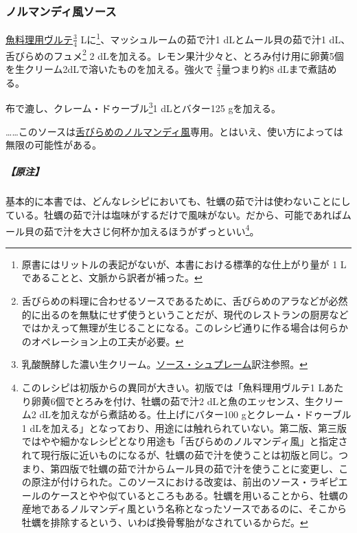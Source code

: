 \begin{recette}
{\subsubsection{ノルマンディ風ソース}\label{sauce-normande}}



\protect\hyperlink{veloute-de-poisson}{魚料理用ヴルテ}\(\frac{3}{4}\)
Lに\footnote{原書にはリットルの表記がないが、本書における標準的な仕上がり量が
  1 Lであることと、文脈から訳者が補った。}、マッシュルームの茹で汁1
dLとムール貝の茹で汁1 dL、舌びらめのフュメ\footnote{舌びらめの料理に合わせるソースであるために、舌びらめのアラなどが必然的に出るのを無駄にせず使うということだが、現代のレストランの厨房などではかえって無理が生じることになる。このレシピ通りに作る場合は何らかのオペレーション上の工夫が必要。}
2
dLを加える。レモン果汁少々と、とろみ付け用に卵黄5個を生クリーム2dLで溶いたものを加える。強火で
\(\frac{2}{3}\)量つまり約8 dLまで煮詰める。

布で漉し、クレーム・ドゥーブル\footnote{乳酸醗酵した濃い生クリーム。\protect\hyperlink{sauce-supreme}{ソース・シュプレーム}訳注参照。}1
dLとバター125 gを加える。

\ldots{}\ldots{}このソースは\protect\hyperlink{sole-normande}{舌びらめのノルマンディ風}専用。とはいえ、使い方によっては無限の可能性がある。

\hypertarget{nota-sauce-normande}{%
\subparagraph{【原注】}\label{nota-sauce-normande}}

基本的に本書では、どんなレシピにおいても、牡蠣の茹で汁は使わないことにしている。牡蠣の茹で汁は塩味がするだけで風味がない。だから、可能であればムール貝の茹で汁を大さじ何杯か加えるほうがずっといい\footnote{このレシピは初版からの異同が大きい。初版では「魚料理用ヴルテ1
  Lあたり卵黄6個でとろみを付け、牡蠣の茹で汁2
  dLと魚のエッセンス、生クリーム2
  dLを加えながら煮詰める。仕上げにバター100 gとクレーム・ドゥーブル1
  dLを加える」となっており、用途には触れられていない。第二版、第三版ではやや細かなレシピとなり用途も「舌びらめのノルマンディ風」と指定されて現行版に近いものになるが、牡蠣の茹で汁を使うことは初版と同じ。つまり、第四版で牡蠣の茹で汁からムール貝の茹で汁を使うことに変更し、この原注が付けられた。このソースにおける改変は、前出のソース・ラギピエールのケースとやや似ているところもある。牡蠣を用いることから、牡蠣の産地であるノルマンディ風という名称となったソースであるのに、そこから牡蠣を排除するという、いわば換骨奪胎がなされているからだ。}。


\end{recette}
